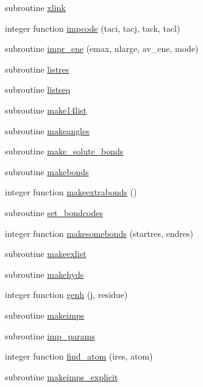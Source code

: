 \begin{DoxyCompactItemize}
\item 
subroutine \hyperlink{classprep_a9e4f40f3858e73e7e2e5e520a6e99cf0}{xlink}
\item 
integer function \hyperlink{classprep_ab2285a42c7d8ccdf6807443c55ebef12}{impcode} (taci, tacj, tack, tacl)
\item 
subroutine \hyperlink{classprep_ae5d14f28b42c21cbeac0a6d01b437b0a}{impr\-\_\-ene} (emax, nlarge, av\-\_\-ene, mode)
\item 
subroutine \hyperlink{classprep_a826ccdfd790c158de7a5c69009883282}{listres}
\item 
subroutine \hyperlink{classprep_a79d5c64b6e03f8453c97ee7e4b0adbc5}{listseq}
\item 
subroutine \hyperlink{classprep_a0c95e6e67020077e83eb467d3a21c3e5}{make14list}
\item 
subroutine \hyperlink{classprep_a8d909ff9b94b53c7825bd883adfa22f7}{makeangles}
\item 
subroutine \hyperlink{classprep_aac9d9e5e1214d4794749dc77e9de4747}{make\-\_\-solute\-\_\-bonds}
\item 
subroutine \hyperlink{classprep_a91be0a910b6ce5c0a9046eeb76457a8f}{makebonds}
\item 
integer function \hyperlink{classprep_a2703dd8ae27ed1ccd2d53f907fa9a64f}{makeextrabonds} ()
\item 
subroutine \hyperlink{classprep_aa25c6d94bb5bfc531ab510e79422fce5}{set\-\_\-bondcodes}
\item 
integer function \hyperlink{classprep_aecab92978bb189465862cc9d64504926}{makesomebonds} (startres, endres)
\item 
subroutine \hyperlink{classprep_ad74718adb758876e6080d71768b03bf2}{makeexlist}
\item 
subroutine \hyperlink{classprep_ab3a376766b645bd5b93ac77220735ee5}{makehyds}
\item 
integer function \hyperlink{classprep_afb869c9c110e8701cde8761ae8856405}{genh} (j, residue)
\item 
subroutine \hyperlink{classprep_a39400f89f3b6e4db1b43078c8671b409}{makeimps}
\item 
subroutine \hyperlink{classprep_add71bde50c689d84c2d8bc7fd0e60c25}{imp\-\_\-params}
\item 
integer function \hyperlink{classprep_a65869d9a985447ee3e4a7fd579b55c0a}{find\-\_\-atom} (ires, atom)
\item 
subroutine \hyperlink{classprep_a72e19a9dc7029265b5d2077e1b4c6288}{makeimps\-\_\-explicit}
\item 

\end{DoxyCompactItemize}
